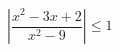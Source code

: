 \begin{ex}[type=inequality]
	\begin{condition}
		\( \left| \dfrac{x^2-3x+2}{x^2-9} \right|\le1 \)
	\end{condition}
	\answer{\( \left[ \dfrac{3-\sqrt{65}}{4};\dfrac{3+\sqrt{65}}{4} \right]\cup\left[ 3\dfrac{2}{3};+\infty \right) \)}
\end{ex}